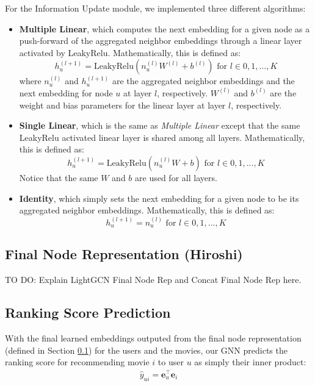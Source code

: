 \documentclass{article}
\begin{document}
For the Information Update module, we implemented three different algorithms:
\begin{itemize}
    \item \textbf{Multiple Linear}, which computes the next embedding for a given node as a push-forward of the aggregated neighbor embeddings through a linear layer activated by LeakyRelu. Mathematically, this is defined as:
    $$
    h_u^{(l+1)} = \mbox{LeakyRelu}(n_u^{(l)} W^{(l)} + b^{(l)}) \text{ for } l \in 0, 1, ..., K
    $$
    where $n_u^{(l)}$ and $h_u^{(l+1)}$ are the aggregated neighbor embeddings and the next embedding for node $u$ at layer $l$, respectively. $W^{(l)}$ and $b^{(l)}$ are the weight and bias parameters for the linear layer at layer $l$, respectively.
    \item \textbf{Single Linear}, which is the same as \textit{Multiple Linear} except that the same LeakyRelu activated linear layer is shared among all layers. Mathematically, this is defined as:
    $$
    h_u^{(l+1)} = \mbox{LeakyRelu}(n_u^{(l)} W + b) \text{ for } l \in 0, 1, ..., K
    $$
    Notice that the same $W$ and $b$ are used for all layers.
    \item \textbf{Identity}, which simply sets the next embedding for a given node to be its aggregated neighbor embeddings. Mathematically, this is defined as:
    $$
    h_u^{(l+1)} = n_u^{(l)} \text{ for } l \in 0, 1, ..., K
    $$
\end{itemize}

\subsection{Final Node Representation (Hiroshi)} \label{final_node_representation}

TO DO: Explain LightGCN Final Node Rep and Concat Final Node Rep here.

\subsection{Ranking Score Prediction}

With the final learned embeddings outputed from the final node representation (defined in Section \ref{final_node_representation}) for the users and the movies, our GNN predicts the ranking score for recommending movie $i$ to user $u$ as simply their inner product:
\begin{align*}
    \hat{y}_{ui} = \mathbf{e}_u^\top \mathbf{e}_i
\end{align*}
\end{document}
